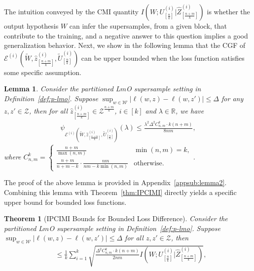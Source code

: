 \documentclass[onecolumn,romanappendices,10pt]{IEEEtran}
\newtheorem{theorem}{Theorem}
\newtheorem{lemma}{Lemma}
\newcommand{\Wcal}{{\mathcal W}}
\newcommand{\Zcal}{{\mathcal Z}}
\newcommand{\EE}{{\mathbb{E}}}
\newcommand{\RR}{{\mathbb{R}}}
\DeclareMathOperator{\gen}{\overline{gen}}
\begin{document}
	The intuition conveyed by the CMI quantity $I( W; U^{(i)}_{[\frac{n}{k}]} | \hat{Z}^{(i)}_{[\frac{n+m}{k}]} )$ is whether the output hypothesis $W$ can infer the supersamples, from a given block, that contribute to the training, and a negative answer to this question implies a good generalization behavior. Next, we show in the following lemma that the CGF of $\mathcal{E}^{(i)}(\tilde{W}, \hat{z}^{(i)}_{[\frac{n+m}{k}]}, \tilde{U}^{(i)}_{[\frac{n}{k}]})$ can be upper bounded when the loss function satisfies some specific assumption. 
	\begin{lemma}\label{lem:bld-CGF-bound}
		Consider the partitioned L$m$O supersample setting in Definition~\ref{def:p-lmo}. Suppose $\sup_{w \in \Wcal} |\ell(w, z) - \ell(w, z')| \leq \Delta$ for any $z, z' \in \Zcal$, then for all $\hat{z}^{(i)}_{[\frac{n+m}{k}]} \in \Zcal^{\frac{n+m}{k}}$, $i \in [k]$ and $\lambda \in \RR$, we have
		\begin{align}
			\psi_{\mathcal{E}^{(i)}(\tilde{W}, \hat{z}^{(i)}_{[\frac{n+m}{k}]}, \tilde{U}^{(i)}_{[\frac{n}{k}]})}(\lambda) \leq \frac{\lambda^2 \Delta^2 C^k_{n,m} \cdot k(n+m)}{8nm}, \label{eq:CGF-bound}
		\end{align}
		where $C^k_{n,m} = \begin{cases}
			\frac{n+m}{\max(n, m)} & \min(n, m) = k, \\
			\frac{n+m}{n+m-k} \cdot \frac{nm}{nm - k \min(n, m)} & \text{otherwise.}
		\end{cases}$.
	\end{lemma}
	The proof of the above lemma is provided in Appendix~\ref{appsub:lemma2}. Combining this lemma with Theorem~\ref{thm:IPCIMI} directly yields a specific upper bound for bounded loss functions.
	
	\begin{theorem}[IPCIMI Bounds for Bounded Loss Difference] \label{thm:bld-IPCIMI}
		Consider the partitioned L$m$O supersample setting in Definition~\ref{def:p-lmo}. Suppose $\sup_{w \in \Wcal} |\ell(w, z) - \ell(w, z')| \leq \Delta$ for all $z, z' \in \Zcal$, then
		\begin{align}
			\gen
			&\leq \frac{1}{k} \sum_{i=1}^{k} \sqrt{\frac{\Delta^2 C^k_{n,m} \cdot k(n+m)}{2nm} I\left( W; U^{(i)}_{[\frac{n}{k}]} | \hat{Z}^{(i)}_{[\frac{n+m}{k}]} \right)},
			\label{eq:bld-IPCIMI}
		\end{align}
	\end{theorem}
	
\end{document}
